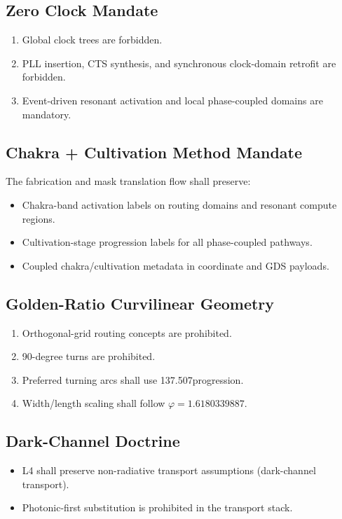 \documentclass[11pt]{article}
\begin{document}
\subsection{Zero Clock Mandate}
\begin{enumerate}
  \item Global clock trees are forbidden.
  \item PLL insertion, CTS synthesis, and synchronous clock-domain retrofit are forbidden.
  \item Event-driven resonant activation and local phase-coupled domains are mandatory.
\end{enumerate}

\subsection{Chakra + Cultivation Method Mandate}
The fabrication and mask translation flow shall preserve:
\begin{itemize}
  \item Chakra-band activation labels on routing domains and resonant compute regions.
  \item Cultivation-stage progression labels for all phase-coupled pathways.
  \item Coupled chakra/cultivation metadata in coordinate and GDS payloads.
\end{itemize}

\subsection{Golden-Ratio Curvilinear Geometry}
\begin{enumerate}
  \item Orthogonal-grid routing concepts are prohibited.
  \item 90-degree turns are prohibited.
  \item Preferred turning arcs shall use 137.507\degree progression.
  \item Width/length scaling shall follow \(\varphi = 1.6180339887\).
\end{enumerate}

\subsection{Dark-Channel Doctrine}
\begin{itemize}
  \item L4 shall preserve non-radiative transport assumptions (dark-channel transport).
  \item Photonic-first substitution is prohibited in the transport stack.
\end{itemize}
\end{document}
